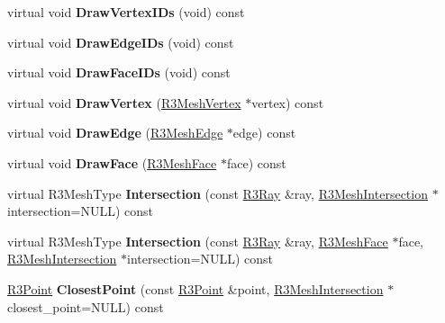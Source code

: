 \begin{DoxyCompactItemize}
\item 
virtual void {\bfseries Draw\+Vertex\+I\+Ds} (void) const \hypertarget{class_r3_mesh_a8030cf589a697b27edd53395a2c8df11}{}\label{class_r3_mesh_a8030cf589a697b27edd53395a2c8df11}

\item 
virtual void {\bfseries Draw\+Edge\+I\+Ds} (void) const \hypertarget{class_r3_mesh_a05c81c93e0c11faad31357349e49e566}{}\label{class_r3_mesh_a05c81c93e0c11faad31357349e49e566}

\item 
virtual void {\bfseries Draw\+Face\+I\+Ds} (void) const \hypertarget{class_r3_mesh_a6d1014621084d818753ff23366c71353}{}\label{class_r3_mesh_a6d1014621084d818753ff23366c71353}

\item 
virtual void {\bfseries Draw\+Vertex} (\hyperlink{class_r3_mesh_vertex}{R3\+Mesh\+Vertex} $\ast$vertex) const \hypertarget{class_r3_mesh_a24cd5f976d37b07d06509e39fb4358ca}{}\label{class_r3_mesh_a24cd5f976d37b07d06509e39fb4358ca}

\item 
virtual void {\bfseries Draw\+Edge} (\hyperlink{class_r3_mesh_edge}{R3\+Mesh\+Edge} $\ast$edge) const \hypertarget{class_r3_mesh_a6a8e509e1d2a67583d4399d6d9047d3b}{}\label{class_r3_mesh_a6a8e509e1d2a67583d4399d6d9047d3b}

\item 
virtual void {\bfseries Draw\+Face} (\hyperlink{class_r3_mesh_face}{R3\+Mesh\+Face} $\ast$face) const \hypertarget{class_r3_mesh_ac9028ed18c7753c4815976a3cf4d2a92}{}\label{class_r3_mesh_ac9028ed18c7753c4815976a3cf4d2a92}

\item 
virtual R3\+Mesh\+Type {\bfseries Intersection} (const \hyperlink{class_r3_ray}{R3\+Ray} \&ray, \hyperlink{struct_r3_mesh_intersection}{R3\+Mesh\+Intersection} $\ast$intersection=N\+U\+LL) const \hypertarget{class_r3_mesh_a90fe11c92dc612051b111c78f04d540e}{}\label{class_r3_mesh_a90fe11c92dc612051b111c78f04d540e}

\item 
virtual R3\+Mesh\+Type {\bfseries Intersection} (const \hyperlink{class_r3_ray}{R3\+Ray} \&ray, \hyperlink{class_r3_mesh_face}{R3\+Mesh\+Face} $\ast$face, \hyperlink{struct_r3_mesh_intersection}{R3\+Mesh\+Intersection} $\ast$intersection=N\+U\+LL) const \hypertarget{class_r3_mesh_aa7cac0de3151a3103cf93beb7d0c7775}{}\label{class_r3_mesh_aa7cac0de3151a3103cf93beb7d0c7775}

\item 
\hyperlink{class_r3_point}{R3\+Point} {\bfseries Closest\+Point} (const \hyperlink{class_r3_point}{R3\+Point} \&point, \hyperlink{struct_r3_mesh_intersection}{R3\+Mesh\+Intersection} $\ast$closest\+\_\+point=N\+U\+LL) const \hypertarget{class_r3_mesh_a657e51069f8762b3800f664f63125bcc}{}\label{class_r3_mesh_a657e51069f8762b3800f664f63125bcc}


\end{DoxyCompactItemize}
